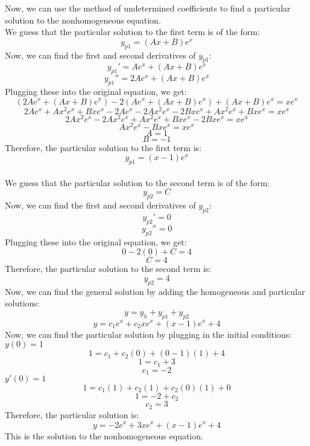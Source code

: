 \documentclass{article}
\begin{document}
Now, we can use the method of undetermined coefficients to find a particular solution to the nonhomogeneous equation.
\\We guess that the particular solution to the first term is of the form:
\[
y_{p1} = (Ax + B)e^{x}
\]
Now, we can find the first and second derivatives of $y_{p1}$:
\[
y_{p1}' = Ae^{x} + (Ax + B)e^{x}
\]
\[
y_{p1}'' = 2Ae^{x} + (Ax + B)e^{x}
\]
Plugging these into the original equation, we get:
\[
(2Ae^{x} + (Ax + B)e^{x}) - 2(Ae^{x} + (Ax + B)e^{x}) + (Ax + B)e^{x} = xe^{x}
\]
\[
2Ae^{x} + Ax^{2}e^{x} + Bxe^{x} - 2Ae^{x} - 2Ax^{2}e^{x} - 2Bxe^{x} + Ax^{2}e^{x} + Bxe^{x} = xe^{x}
\]
\[
    2Ax^{2}e^{x} - 2Ax^{2}e^{x} + Ax^{2}e^{x} + Bxe^{x} - 2Bxe^{x} = xe^{x}
\]
\[
    Ax^{2}e^{x} - Bxe^{x} = xe^{x}
\]
\[
    A = 1
\]
\[
    B = -1
\]
Therefore, the particular solution to the first term is:
\[
y_{p1} = (x - 1)e^{x}
\]
\\We guess that the particular solution to the second term is of the form:
\[
y_{p2} = C
\]
Now, we can find the first and second derivatives of $y_{p2}$:
\[
y_{p2}' = 0
\]
\[
y_{p2}'' = 0
\]
Plugging these into the original equation, we get:
\[
0 - 2(0) + C = 4
\]
\[
    C = 4
\]
Therefore, the particular solution to the second term is:
\[
y_{p2} = 4
\]
Now, we can find the general solution by adding the homogeneous and particular solutions:
\[
y = y_h + y_{p1} + y_{p2}
\]
\[
y = c_1e^{x} + c_2xe^{x} + (x - 1)e^{x} + 4
\]
Now, we can find the particular solution by plugging in the initial conditions:
$y(0) = 1$
\[
1 = c_1 + c_2(0) + (0 - 1)(1) + 4
\]
\[
1 = c_1 + 3
\]
\[
c_1 = -2
\]
$y'(0) = 1$
\[
    1 = c_1(1) + c_2(1) + c_2(0)(1) + 0
\]
\[
    1 = -2 + c_2
\]
\[
    c_2 = 3
\]
Therefore, the particular solution is:
\[
y = -2e^{x} + 3xe^{x} + (x - 1)e^{x} + 4
\]
This is the solution to the nonhomogeneous equation.
\end{document}
